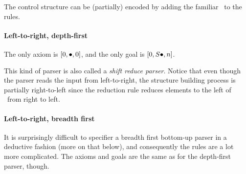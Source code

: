 The control structure can be (partially) encoded by adding the familiar \psep\ to the rules.

\paragraph{Left-to-right, depth-first}
The only axiom is $[0, \psep ,0]$, and the only goal is $[0,S \psep ,n]$.

\begin{prooftree}
\end{prooftree}

\begin{prooftree}
\end{prooftree}

This kind of parser is also called a \emph{shift reduce parser}.
Notice that even though the parser reads the input from left-to-right, the structure building process is partially right-to-left since the reduction rule reduces elements to the left of \psep\ from right to left.

\paragraph{Left-to-right, breadth first}
It is surprisingly difficult to specifier a breadth first bottom-up parser in a deductive fashion (more on that below), and consequently the rules are a lot more complicated.
The axioms and goals are the same as for the depth-first parser, though.

\begin{prooftree}
\end{prooftree}

\begin{prooftree}
\end{prooftree}

\begin{prooftree}
\end{prooftree}


